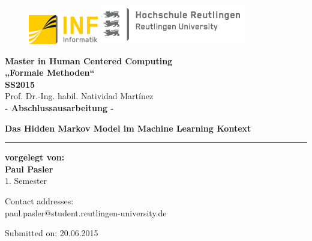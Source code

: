 \begin{titlepage}

\begin{center}

\begin{figure}
\begin{minipage}[H]{4cm}
\centering
\includegraphics[width=0.8\linewidth]{Bilder/Deckblatt/universityLogo}
\end{minipage}
\hfill
\begin{minipage}[H]{6cm}
\centering
\includegraphics[width=1\linewidth]{Bilder/Deckblatt/CompanyLogo}
\end{minipage}
\end{figure}

\vspace*{0.8cm}

\textbf{Master in Human Centered Computing}\\
\textbf{„Formale Methoden“} \\
\vspace*{0.2cm}
{\large \textbf{SS2015\\}}
\vspace*{0.4cm}
Prof. Dr.-Ing. habil. Natividad Martínez\\
\vspace*{0.8cm}
{\large \textbf{- Abschlussausarbeitung -}}

\textbf{{\large {\Large Das Hidden Markov Model im Machine Learning Kontext}}}\\

\noindent\rule{\textwidth}{2pt}
\vspace*{0.6cm}

\textbf{vorgelegt von:\\}
{\large \textbf{Paul Pasler\\}}
1. Semester 

\vspace*{0.6cm}

Contact addresses:\\
paul.pasler@student.reutlingen-university.de\\

\vspace*{0.6cm}

Submitted on:	20.06.2015



\end{center}

\end{titlepage}
